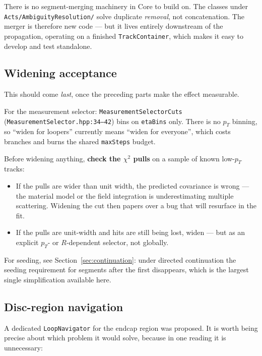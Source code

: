 \documentclass[11pt,a4paper]{article}
\newcommand{\code}[1]{\texttt{\small #1}}
\newcommand{\srcref}[2]{\code{#1:#2}}
\begin{document}
\medskip\noindent
There is no segment-merging machinery in Core to build on. The classes under
\code{Acts/\allowbreak AmbiguityResolution/} solve duplicate \emph{removal}, not
concatenation. The merger is therefore new code --- but it lives entirely
downstream of the propagation, operating on a finished
\code{TrackContainer}, which makes it easy to develop and test standalone.

\subsection{Widening acceptance}
\label{sec:widening}

This should come \emph{last}, once the preceding parts make the effect
measurable.

For the measurement selector: \code{MeasurementSelectorCuts}
(\srcref{MeasurementSelector.hpp}{34--42}) bins on \code{etaBins} only. There is
no $p_T$ binning, so ``widen for loopers'' currently means ``widen for
everyone'', which costs branches and burns the shared \code{maxSteps} budget.

Before widening anything, \textbf{check the $\chi^2$ pulls} on a sample of known
low-$p_T$ tracks:
\begin{itemize}
\item If the pulls are wider than unit width, the predicted covariance is wrong
  --- the material model or the field integration is underestimating multiple
  scattering. Widening the cut then papers over a bug that will resurface in the
  fit.
\item If the pulls are unit-width and hits are still being lost, widen --- but as
  an explicit $p_T$- or $R$-dependent selector, not globally.
\end{itemize}

For seeding, see Section~\ref{sec:continuation}: under directed continuation the
seeding requirement for segments after the first disappears, which is the
largest single simplification available here.

\subsection{Disc-region navigation}
\label{sec:discs}

A dedicated \code{LoopNavigator} for the endcap region was proposed. It is worth
being precise about which problem it would solve, because in one reading it is
unnecessary:
\end{document}
